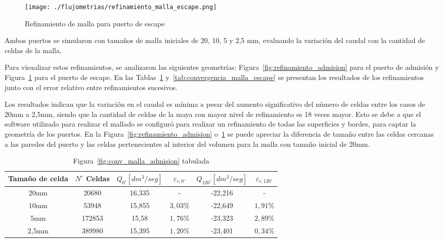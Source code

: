 \begin{figure}[h!]  \centering
\texttt{[image: ./flujometrias/refinamiento\_malla\_escape.png]}
  \caption{Refinamiento de malla para puerto de
escape}\label{fig:refinamiento_escape}
\end{figure}

Ambos puertos se simularon con tamaños de malla iniciales de 20, 10, 5 y 2,5 mm,
evaluando la variación del caudal con la cantidad de celdas de la malla.

Para visualizar estos refinamientos, se analizaron las siguientes geometrías:
Figura~\ref{fig:refinamiento_admision} para el puerto de admisión y
Figura~\ref{fig:refinamiento_escape} para el puerto de escape.
%
En las Tablas~\ref{tab:convergencia_malla_admision}
y~\ref{tab:convergencia_malla_escape} se presentan los resultados de los
refinamientos junto con el error relativo entre refinamientos sucesivos.

Los resultados indican que la variación en el caudal es mínima a pesar del
aumento significativo del número de celdas entre los casos de 20mm a 2,5mm,
siendo que la cantidad de celdas de la maya con mayor nivel de refinamiento es
18 veces mayor.
%
Esto se debe a que el software utilizado para realizar el mallado se configuró
para realizar un refinamiento de todas las superficies y bordes, para captar la
geometría de los puertos.
%
En la Figura~\ref{fig:refinamiento_admision} o~\ref{fig:refinamiento_escape} se
puede apreciar la diferencia de tamaño entre las celdas cercanas a las paredes
del puerto y las celdas pertenecientes al interior del volumen para la malla con
tamaño inicial de 20mm.


\begin{table}[h!]  \centering
  \begin{tabular}{cccccc}\toprule
    Tamaño de celda & $N^{\circ}$ Celdas & $Q_{0^{\circ}} [dm^{3}/seg]$ & $\varepsilon_{r,0^{\circ}}$ & $Q_{120^{\circ}} [dm^{3}/seg]$ & $\varepsilon_{r,120^{\circ}}$ \\ \midrule
    20mm & 20680  & 16,335 & -        & -22,216 & - \\
    10mm  & 53948  & 15,855 & $3,03\%$ & -22,649 & $1,91\%$ \\
    5mm   & 172853 & 15,58  & $1,76\%$ & -23,323 & $2,89\%$ \\
    2,5mm & 389980 & 15,395 & $1,20\%$ & -23,401 & $0,34\%$ \\ \bottomrule
  \end{tabular}
  \caption{Figura~\ref{fig:conv_malla_admision}
tabulada}\label{tab:convergencia_malla_admision}
\end{table}

